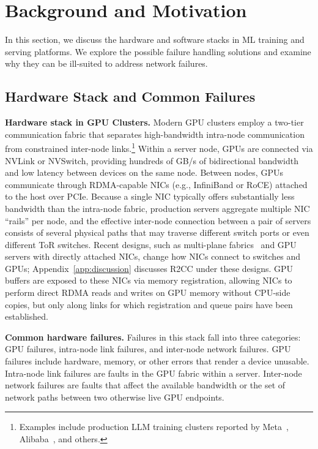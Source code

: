\section{Background and Motivation}

In this section, we discuss the hardware and software stacks in ML training and serving platforms. We explore the possible failure handling solutions and examine why they can be ill-suited to address network failures.

\subsection{Hardware Stack and Common Failures }
\label{sec:bg-stack}

\noindent\textbf{Hardware stack in GPU Clusters.}
Modern GPU clusters employ a two-tier communication fabric that separates high-bandwidth intra-node communication from constrained inter-node links.\footnote{Examples include production LLM training clusters reported by Meta~\cite{gangidi2024rdma}, Alibaba~\cite{qian2024alibaba}, and others.}
Within a server node, GPUs are connected via NVLink or NVSwitch, providing hundreds of GB/s of bidirectional bandwidth and low latency between devices on the same node.
Between nodes, GPUs communicate through RDMA-capable NICs (e.g., InfiniBand or RoCE) attached to the host over PCIe.
Because a single NIC typically offers substantially less bandwidth than the intra-node fabric, production servers aggregate multiple NIC ``rails'' per node, and the effective inter-node connection between a pair of servers consists of several physical paths that may traverse different switch ports or even different ToR switches.
Recent designs, such as multi-plane fabrics~\cite{qian2024alibaba,oci-multiplanar,khashab2026high} and GPU servers with directly attached NICs, change how NICs connect to switches and GPUs; Appendix~\ref{app:discussion} discusses R2CC under these designs.
GPU buffers are exposed to these NICs via memory registration, allowing NICs to perform direct RDMA reads and writes on GPU memory without CPU-side copies, but only along links for which registration and queue pairs have been established.

\smallskip\noindent\textbf{Common hardware failures.}
Failures in this stack fall into three categories: GPU failures, intra-node link failures, and inter-node network failures. GPU failures include hardware, memory, or other errors that render a device unusable. Intra-node link failures are faults in the GPU fabric within a server. Inter-node network failures are faults that affect the available bandwidth or the set of network paths between two otherwise live GPU endpoints.

